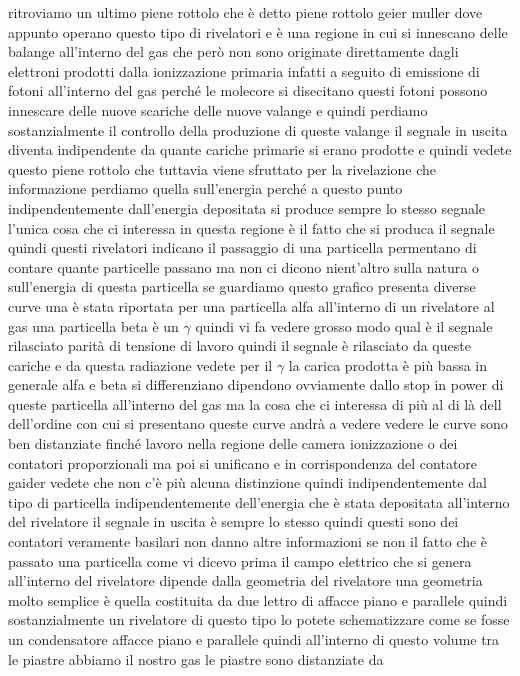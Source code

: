 {ritroviamo un ultimo piene rottolo che è detto piene rottolo geier muller dove appunto operano questo tipo di rivelatori e è una regione in cui si innescano delle balange all'interno del gas che però non sono originate direttamente dagli elettroni prodotti dalla ionizzazione primaria infatti a seguito di emissione di fotoni all'interno del gas perché le molecore si disecitano questi fotoni possono innescare delle nuove scariche delle nuove valange e quindi perdiamo sostanzialmente il controllo della produzione di queste valange il segnale in uscita diventa indipendente da quante cariche primarie si erano prodotte e quindi vedete questo piene rottolo che tuttavia viene sfruttato per la rivelazione che informazione perdiamo quella sull'energia perché a questo punto indipendentemente dall'energia depositata si produce sempre lo stesso segnale l'unica cosa che ci interessa in questa regione è il fatto che si produca il segnale quindi questi rivelatori indicano il passaggio di una particella permentano di contare quante particelle passano ma non ci dicono nient'altro sulla natura o sull'energia di questa particella se guardiamo questo grafico presenta diverse curve una è stata riportata per una particella alfa all'interno di un rivelatore al gas una particella beta è un $\gamma$ quindi vi fa vedere grosso modo qual è il segnale rilasciato parità di tensione di lavoro quindi il segnale è rilasciato da queste cariche e da questa radiazione vedete per il $\gamma$ la carica prodotta è più bassa in generale alfa e beta si differenziano dipendono ovviamente dallo stop in power di queste particella all'interno del gas ma la cosa che ci interessa di più al di là dell dell'ordine con cui si presentano queste curve andrà a vedere vedere le curve sono ben distanziate finché lavoro nella regione delle camera ionizzazione o dei contatori proporzionali ma poi si unificano e in corrispondenza del contatore gaider vedete che non c'è più alcuna distinzione quindi indipendentemente dal tipo di particella indipendentemente dell'energia che è stata depositata all'interno del rivelatore il segnale in uscita è sempre lo stesso quindi questi sono dei contatori veramente basilari non danno altre informazioni se non il fatto che è passato una particella come vi dicevo prima il campo elettrico che si genera all'interno del rivelatore dipende dalla geometria del rivelatore una geometria molto semplice è quella costituita da due lettro di affacce piano e parallele quindi sostanzialmente un rivelatore di questo tipo lo potete schematizzare come se fosse un condensatore affacce piano e parallele quindi all'interno di questo volume tra le piastre abbiamo il nostro gas le piastre sono distanziate da 

}
